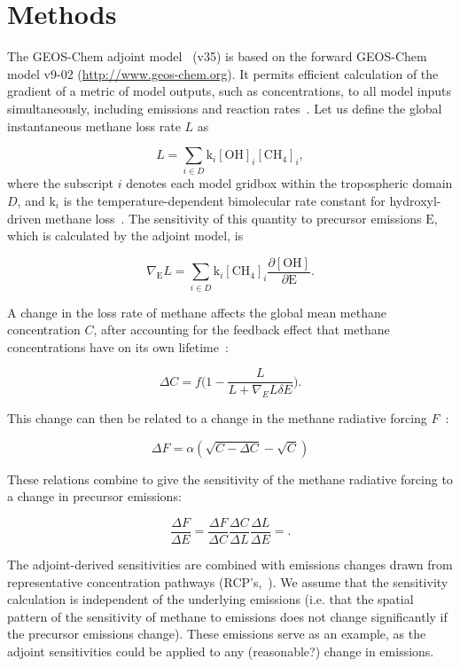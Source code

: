 \section{Methods}

The GEOS-Chem adjoint model~\cite{ref:henze2007} (v35) is based on the forward GEOS-Chem model v9-02 (\url{http://www.geos-chem.org}). It permits efficient calculation of the gradient of a metric of model outputs, such as concentrations, to all model inputs simultaneously, including emissions and reaction rates~\cite{ref:walker2015}. Let us define the global instantaneous methane loss rate $L$ as

\begin{equation}
L=\sum_{i \in D} \mathrm{k}_i \mathrm{[OH]}_i \mathrm{[CH_4]}_i,
\end{equation}
where the subscript $i$ denotes each model gridbox within the tropospheric domain $D$, and $\mathrm{k}_i$ is the temperature-dependent bimolecular rate constant for hydroxyl-driven methane loss~\citep{ref:sander2011}. The sensitivity of this quantity to precursor emissions $\mathrm{E}$, which is calculated by the adjoint model, is

\begin{equation}
\nabla_\mathrm{E} L = \sum_{i \in D} \mathrm{k}_i \mathrm{[CH_4]}_i \frac{\partial \mathrm{[OH]}}{\partial \mathrm{E}}.
\end{equation}

A change in the loss rate of methane affects the global mean methane concentration $C$, after accounting for the feedback effect that methane concentrations have on its own lifetime~\citep{ref:naik2005}:

\begin{equation}
\Delta C = f\big(1 - \frac{L}{L+\nabla_E L \delta E}\big).
\end{equation}

This change can then be related to a change in the methane radiative forcing $F$~\citep{ref:myhre1998}:

\begin{equation}
\Delta F = \alpha (\sqrt{C-\Delta C} - \sqrt{C})
\end{equation}

These relations combine to give the sensitivity of the methane radiative forcing to a change in precursor emissions:

\begin{equation}
\frac{\Delta F}{\Delta E} = \frac{\Delta F}{\Delta C} \frac{\Delta C}{\Delta L} \frac{\Delta L}{\Delta E} = .
\end{equation}

The adjoint-derived sensitivities are combined with emissions changes drawn from representative concentration pathways (RCP's,~\citet{ref:vanvuuren2011}). We assume that the sensitivity calculation is independent of the underlying emissions (i.e. that the spatial pattern of the sensitivity of methane to emissions does not change significantly if the precursor emissions change). These emissions serve as an example, as the adjoint sensitivities could be applied to any (reasonable?) change in emissions.